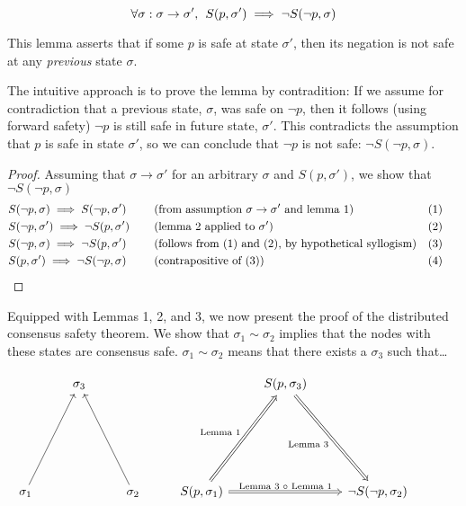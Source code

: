 \documentclass{article}
\theoremstyle{definition}
\begin{document}
\begin{lemma}
$$
\forall \sigma:\sigma \to \sigma',\hspace{1.5mm} S(p,\sigma') \implies \neg{S(\neg{p},\sigma)}
$$
\end{lemma}

This lemma asserts that if some $p$ is safe at state $\sigma'$, then its negation is not safe at any \emph{previous} state $\sigma$.

The intuitive approach is to prove the lemma by contradition: If we assume for contradiction that a previous state, $\sigma$, was safe on $\neg{p}$, then it follows (using forward safety) $\neg{p}$ is still safe in future state, $\sigma'$. This contradicts the assumption that $p$ is safe in state $\sigma'$, so we can conclude that $\neg{p}$ is not safe: $\neg{S(\neg{p},\sigma)}$.

\begin{proof}
  Assuming that $\sigma \to \sigma'$ for an arbitrary $\sigma$ and $S(p,\sigma')$, we show that $\neg{S(\neg{p},\sigma)}$
  \begin{align*}
    &S(\neg{p},\sigma) \implies S(\neg{p},\sigma') &&\text{(from assumption $\sigma \to \sigma'$ and lemma 1)}   &&\text{(1)} \\
    &S(\neg{p},\sigma') \implies \neg{S(p,\sigma')} &&\text{(lemma 2 applied to $\sigma'$) }   &&\text{(2)} \\
    &S(\neg{p},\sigma) \implies \neg{S(p,\sigma')} &&\text{(follows from (1) and (2), by hypothetical syllogism)} &&\text{(3)} \\
    &S(p,\sigma') \implies \neg{S(\neg{p},\sigma)} \hspace{5mm} \qedhere &&\text{(contrapositive of (3))} &&\text{(4)} \hspace{5mm}
  \end{align*}
\end{proof}

\vspace{5mm}

Equipped with Lemmas 1, 2, and 3, we now present the proof of the distributed consensus safety theorem. We show that $\sigma_1 \sim \sigma_2$ implies that the nodes with these states are consensus safe. $\sigma_1 \sim \sigma_2$ means that there exists a $\sigma_3$ such that\ldots


\begin{equation*}
\begin{tikzcd}
{}
  &
\sigma_3
  &
{}
  &
{}
  &
S(p,\sigma_3)
  &
{}
  &
{}
  \\
{}
  &
{}
  &
{}
  &
{}
  &
{}
  &
{}
  &
{}
  \\
{}
  &
{}
  &
{}
  &
{}
  &
{}
  &
{}
  &
{}
  \\
\sigma_1
  \arrow[uuur,""]
  &
{}
  &
\sigma_2
  \arrow[uuul,""]
{}
  &
S(p,\sigma_1)
  \arrow[uuur,Rightarrow,"\text{Lemma 1}"]
  \arrow[rr,Rightarrow,"\text{Lemma 3 $\circ$ Lemma 1}"]
  &
{}
  &
\neg{S(\neg{p},\sigma_2)}
  \arrow[uuul,Leftarrow,"\text{Lemma 3}"]
\end{tikzcd}
\end{equation*}
\end{document}
